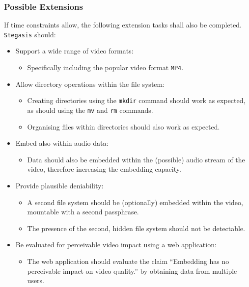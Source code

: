 \documentclass[paper=a4, fontsize=11pt,twoside]{scrartcl}    %
\numberwithin{table}{section}
\numberwithin{figure}{section}
\begin{document}
\subsubsection{Possible Extensions}

If time constraints allow, the following extension tasks shall also be completed.\\

\noindent
\texttt{Stegasis} should:

\begin{itemize}
\item Support a wide range of video formats:
	\begin{itemize}
		\item Specifically including the popular video format \texttt{MP4}.		
	\end{itemize}
\item Allow directory operations within the file system:
	\begin{itemize}
		\item Creating directories using the \texttt{mkdir} command should work as expected, as should using the \texttt{mv} and \texttt{rm} commands.
		\item Organising files within directories should also work as expected.
	\end{itemize}	
\item Embed also within audio data:
	\begin{itemize}
		\item Data should also be embedded within the (possible) audio stream of the video, therefore increasing the embedding capacity.
	\end{itemize}	
\item Provide plausible deniability:
	\begin{itemize}
		\item A second file system should be (optionally) embedded within the video, mountable with a second passphrase.
		\item The presence of the second, hidden file system should not be detectable.
	\end{itemize}
\item Be evaluated for perceivable video impact using a web application:
	\begin{itemize}
		\item The web application should evaluate the claim ``Embedding has no perceivable impact on video quality.'' by obtaining data from multiple users.
	\end{itemize}		
\end{itemize}
\end{document}
